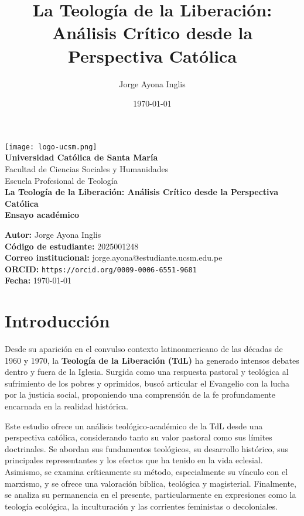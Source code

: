 \documentclass[12pt]{article}
\title{La Teología de la Liberación: Análisis Crítico desde la Perspectiva Católica}
\author{Jorge Ayona Inglis}
\date{\today}
\begin{document}
\begin{titlepage}
    \begin{center}
        \vspace*{1cm}
        \texttt{[image: logo-ucsm.png]} \\[1cm]
        \textbf{\Large Universidad Católica de Santa María} \\
        Facultad de Ciencias Sociales y Humanidades \\
        Escuela Profesional de Teología \\
        \vfill
        \textbf{\LARGE La Teología de la Liberación: Análisis Crítico desde la Perspectiva Católica} \\[0.5cm]
        \textbf{Ensayo académico} \\[0.5cm]
        \vfill
        \begin{flushleft}
        \textbf{Autor:} Jorge Ayona Inglis \\
        \textbf{Código de estudiante:} 2025001248 \\
        \textbf{Correo institucional:} jorge.ayona@estudiante.ucsm.edu.pe \\
        \textbf{ORCID:} \texttt{https://orcid.org/0009-0006-6551-9681} \\
        \textbf{Fecha:} \today \\
        \end{flushleft}
        \vfill
    \end{center}
\end{titlepage}

\section*{Introducción}
Desde su aparición en el convulso contexto latinoamericano de las décadas de 1960 y 1970, la \textbf{Teología de la Liberación (TdL)} ha generado intensos debates dentro y fuera de la Iglesia. Surgida como una respuesta pastoral y teológica al sufrimiento de los pobres y oprimidos, buscó articular el Evangelio con la lucha por la justicia social, proponiendo una comprensión de la fe profundamente encarnada en la realidad histórica.

Este estudio ofrece un análisis teológico-académico de la TdL desde una perspectiva católica, considerando tanto su valor pastoral como sus límites doctrinales. Se abordan sus fundamentos teológicos, su desarrollo histórico, sus principales representantes y los efectos que ha tenido en la vida eclesial. Asimismo, se examina críticamente su método, especialmente su vínculo con el marxismo, y se ofrece una valoración bíblica, teológica y magisterial. Finalmente, se analiza su permanencia en el presente, particularmente en expresiones como la teología ecológica, la inculturación y las corrientes feministas o decoloniales.
\end{document}
